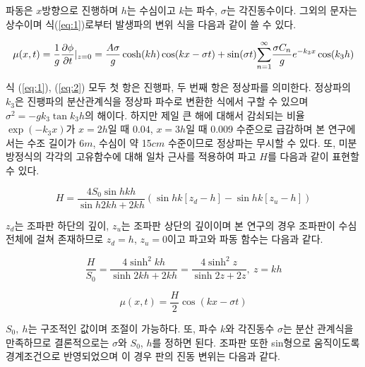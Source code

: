 파동은 $x$방향으로 진행하며 $h$는 수심이고 $k$는 파수, $\sigma$는 각진동수이다. 그외의 문자는 상수이며 식(\ref{eq:1})로부터 발생파의 변위 식을 다음과 같이 쓸 수 있다.

\begin{equation} \label{eq:2}
{
\mu(x, t) = {{1 \over g}{{\partial \phi} \over {\partial t}}|_{z=0} } = \frac{A \sigma}{g} \cosh(kh) \cos(kx-\sigma t) +
\sin(\sigma t) {\sum_{n=1}^{\infty}} \frac{\sigma C_n}{g} e^{-k_3 x} \cos(k_3 h)
}
\end{equation}


식 (\ref{eq:1}), (\ref{eq:2}) 모두 첫 항은 진행파, 두 번째 항은 정상파를 의미한다. 정상파의 $k_3$은 진팽파의 분산관계식을 정상파 파수로 변환한 식에서 구할 수 있으며 $\sigma ^2 = -g k_3 \tan{k_3 h}$의 해이다. 하지만 제일 큰 해에 대해서 감쇠되는 비율 $\exp{(-k_{3}x)}$가 $x=2h$일 때 $0.04$, $x=3h$일 때 0.009 수준으로 급감하며 본 연구에서는 수조 길이가 6$m$, 수심이 약 15$cm$ 수준이므로 정상파는 무시할 수 있다. 또, 미분방정식의 각각의 고유함수에 대해 일차 근사를 적용하여 파고 $H$를 다음과 같이 표현할 수 있다.

\begin{equation} \label{eq:4}
H = \frac{4 S_0 \sin h{kh}}{\sin h{2kh}+2kh} \left(\sin h{k[z_d - h]} - \sin h{k[z_u - h]}\right)
\end{equation}


$z_d$는 조파판 하단의 깊이, $z_u$는 조파판 상단의 깊이이며 본 연구의 경우 조파판이 수심 전체에 걸쳐 존재하므로 $z_d = h$, $z_u = 0$이고 파고와 파동 함수는 다음과 같다.

\begin{equation} \label{eq:5}
{
    \frac{H}{S_0}=\frac{4 \sinh^2 k h}{\sinh 2kh + 2kh}
     = \frac{4 \sinh^2 z}{\sinh 2z+2 z}, ~z=kh
}
\end{equation}

\begin{equation} \label{eq:6}
{
    \mu(x, t)=\frac{H}{2} \cos (k x-\sigma t)
}
\end{equation}


$S_0,~h$는 구조적인 값이며 조절이 가능하다. 또, 파수 $k$와 각진동수 $\sigma$는 분산 관계식을 만족하므로 결론적으로는 $\sigma$와 $S_0$, $h$를 정하면 된다. 조파판 또한 sin형으로 움직이도록 경계조건으로 반영되었으며 이 경우 판의 진동 변위는 다음과 같다.

